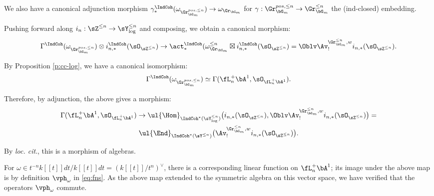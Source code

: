 We also have a canonical adjunction morphism
$\gamma_*^{\IndCoh}(\omega_{\Gr_{\bG_m}^{pos,\leq n}}) \to
\omega_{\Gr_{\bG_m}}$ for $\gamma:\Gr_{\bG_m}^{pos,\leq n} \to
\Gr_{\bG_m}^{\leq n}$ the (ind-closed) embedding.

Pushing forward along $i_n:\sZ^{\leq n} \to \sY_{\log}^{\leq n}$
and composing, we obtain a canonical morphism:
%
\[
\Gamma^{\IndCoh}(\omega_{\Gr_{\bG_m}^{pos,\leq n}}) \otimes
i_{n,*}^{\IndCoh}(\sO_{\sZ^{\leq n}}) \to
\act_*^{\IndCoh}(\omega_{\Gr_{\bG_m}}^{\leq n} \boxtimes
i_{n,*}^{\IndCoh}(\sO_{\sZ^{\leq n}}) =
\Oblv \Av_!^{\Gr_{\bG_m}^{\leq n},w}
i_{n,*}(\sO_{\sZ^{\leq n}}).
\]


By Proposition \ref{p:cc-log}, we have a canonical isomorphism:
%
\[
\Gamma^{\IndCoh}(\omega_{\Gr_{\bG_m}^{pos,\leq n}}) \simeq
\Gamma(\fL_n^+ \bA^1,\sO_{\fL_n^+ \bA^1}).
\]

 Therefore, by adjunction, the above gives a morphism:
%
\[
\begin{gathered}
\Gamma(\fL_n^+ \bA^1,\sO_{\fL_n^+ \bA^1}) \to
\ul{\Hom}_{\IndCoh^*(\sY_{\log}^{\leq n})}
\big(i_{n,*}(\sO_{\sZ^{\leq n}}),
\Oblv\Av_!^{\Gr_{\bG_m}^{\leq n},w}  i_{n,*}(\sO_{\sZ^{\leq n}})\big) = \\
\ul{\End}_{\IndCoh^*(\sY^{\leq n})}
\big(\Av_!^{\Gr_{\bG_m}^{\leq n},w}  i_{n,*}(\sO_{\sZ^{\leq n}})\big).
\end{gathered}
\]

 By \emph{loc. cit}., this is a morphism
of algebras.

For $\omega \in t^{-n}k[[t]]dt/k[[t]]dt = (k[[t]]/t^n)^{\vee}$,
there is a corresponding linear function on $\fL_n^+ \bA^1$;
its image under the above map is by definition $\vph_{\omega}$ in
\eqref{eq:fns}. As the above map extended to the symmetric
algebra on this vector space, we have verified that
the operators $\vph_{\omega}$ commute.


